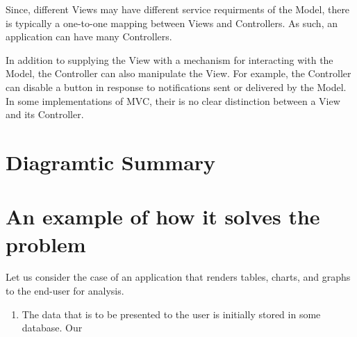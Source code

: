 Since, different Views may have different service requirments of the Model, there is typically a one-to-one mapping between Views and Controllers. As such, an application can have many Controllers. 

In addition to supplying the View with a mechanism for interacting with the Model, the Controller can also manipulate the View. For example, the Controller can disable a button in response to notifications sent or delivered by the Model. In some implementations of MVC, their is no clear distinction between a View and its Controller. 

\section{Diagramtic Summary}

\begin{center}



\end{center}


\section{An example of how it solves the problem}


Let us consider the case of an application that renders tables, charts, and graphs to the end-user for analysis. 


\begin{enumerate}
\item The data that is to be presented to the user is initially stored in some database. Our 
\end{enumerate}








